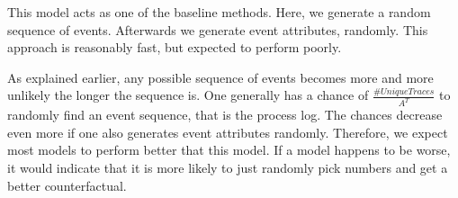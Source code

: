 \documentclass[./../../paper.tex]{subfiles}
\begin{document}
This model acts as one of the baseline methods. Here, we generate a random sequence of events. Afterwards we generate event attributes, randomly. This approach is reasonably fast, but expected to perform poorly.

As explained earlier, any possible sequence of events becomes more and more unlikely the longer the sequence is. One generally has a chance of $\frac{\#UniqueTraces}{A^T}$ to randomly find an event sequence, that is the process log. The chances decrease even more if one also generates event attributes randomly. Therefore, we expect most models to perform better that this model. If a model happens to be worse, it would indicate that it is more likely to just randomly pick numbers and get a better counterfactual.  
\end{document}
